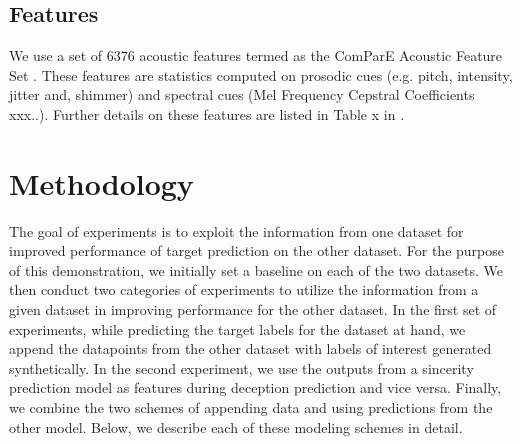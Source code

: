 \documentclass{article}
\begin{document}
\subsection{Features} 
We use a set of 6376 acoustic features termed as the ComParE Acoustic Feature Set \cite{}.
These features are statistics computed on prosodic cues (e.g. pitch, intensity, jitter and, shimmer) and spectral cues (Mel Frequency Cepstral Coefficients xxx..).
Further details on these features are listed in Table x in \cite{}. 


\section{Methodology}

The goal of experiments is to exploit the information from one dataset for improved performance of target prediction on the other dataset.
For the purpose of this demonstration, we initially set a baseline on each of the two datasets.
We then conduct two categories of experiments to utilize the information from a given dataset in improving performance for the other dataset. 
In the first set of experiments, while predicting the target labels for the dataset at hand, we append the datapoints from the other dataset with labels of interest generated synthetically. 
In the second experiment, we use the outputs from a sincerity prediction model as features during deception prediction and vice versa.
Finally, we combine the two schemes of appending data and using predictions from the other model.
Below, we describe each of these modeling schemes in detail. 
\end{document}

